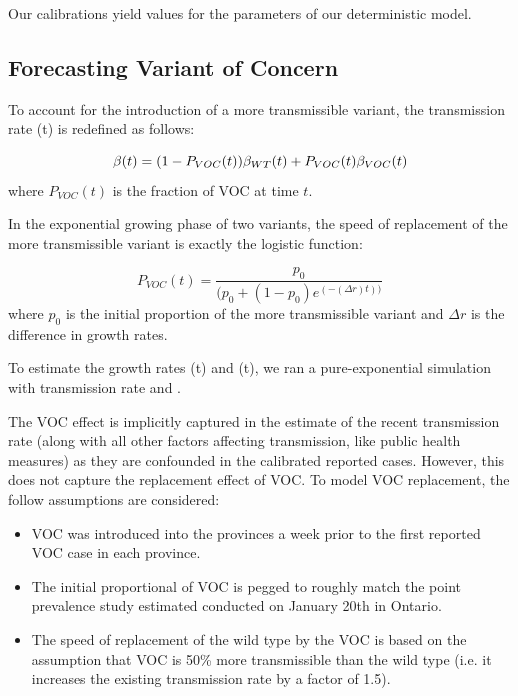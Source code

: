 \documentclass[12pt]{article}\usepackage[]{graphicx}\usepackage[]{color}
\begin{document}
Our calibrations yield values for the parameters of our
deterministic model.


\subsection*{Forecasting Variant of Concern}

To account for the introduction of a more transmissible variant, the transmission rate \B(t) is redefined as follows:

\begin{equation}
\beta(t) = (1 -  P_{VOC}(t))\beta_{WT}(t) + P_{VOC}(t)\beta_{VOC}(t)
\end{equation}
where $P_{VOC}(t)$ is the fraction of VOC at time $t$.

In the exponential growing phase of two variants, the speed of replacement of the more transmissible variant is exactly the logistic function:

\begin{equation}
P_{VOC}(t) = \frac{p_0}{(p_0+(1-p_0)e^{(-(\Delta r)t))}}
\end{equation}
where $p_0$ is the initial proportion of the more transmissible variant and $\Delta r$ is the difference in growth rates.

To estimate the growth rates \littlerwt(t) and \littlervoc(t), we ran a pure-exponential simulation with transmission rate \Bwt and \Bvoc.

The VOC effect is implicitly captured in the estimate of the recent transmission rate (along with all other factors affecting transmission, like public health measures) as they are confounded in the calibrated reported cases. 
However, this does not capture the replacement effect of VOC.
To model VOC replacement, the follow assumptions are considered:

\begin{itemize}
\item{VOC was introduced into the provinces a week prior to the first reported VOC case in each province.}
\item{The initial proportional of VOC is pegged to roughly match the point prevalence study estimated conducted on January 20th in Ontario.}
\item{The speed of replacement of the wild type by the VOC is based on the assumption that VOC is 50\% more transmissible than the wild type (i.e. it increases the existing transmission rate by a factor of 1.5).}
\end{itemize}
\end{document}
